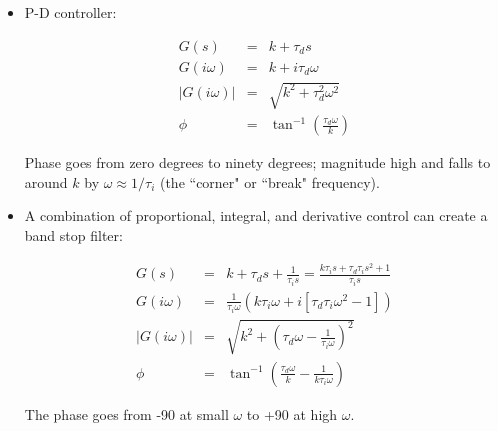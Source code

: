 \documentclass{article}
\begin{document}
\begin{itemize}
\item P-D controller:

\begin{eqnarray*}
G(s) & = & k +  \tau_d s\\
G(i\omega) & = &  k + i \tau_d \omega\\
\left| G(i\omega) \right| & = & \sqrt{k^2 + \tau_d^2 \omega^2}\\
\phi &= &  \tan^{-1} \left( \frac{\tau_d \omega}{k} \right)
\end{eqnarray*}

Phase goes from zero degrees to ninety degrees; magnitude high and falls to around $k$ by $\omega \approx 1/\tau_i$ (the ``corner" or ``break" frequency).

\item A combination of proportional, integral, and derivative control can create a band stop filter:

\begin{eqnarray*}
G(s) & = & k + \tau_d s + \frac{1}{\tau_i s} = \frac{k\tau_i s + \tau_d \tau_i s^2 + 1}{\tau_i s}\\ 
G(i\omega) & = &\frac{1}{\tau_i \omega} \left( k \tau_i \omega +  i \left[ \tau_d \tau_i \omega^2 - 1 \right]  \right)\\
\left| G(i\omega) \right| & = & \sqrt{k^2 + \left( \tau_d \omega - \frac{1}{\tau_i \omega} \right)^2}\\
\phi &= & \tan^{-1}  \left( \frac{\tau_d \omega}{k} - \frac{1}{k\tau_i \omega} \right)
\end{eqnarray*}

The phase goes from -90 at small $\omega$ to +90 at high $\omega$.

\begin{figure}
\centering
{}
\label{fig:eachcomponentalone}
\end{figure}


\end{itemize}
\end{document}
